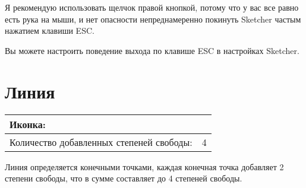 \documentclass[12pt,titlepage]{article}
\newcommand{\icon}[1]{\raisebox{-1em}{\rule{0pt}{27pt}\texttt{[image: images/\#1]}}}
\newcommand{\dofAdded}{Количество добавленных степеней свободы:}
\begin{document}
Я рекомендую использовать щелчок правой кнопкой, потому что у вас все равно есть рука на мыши, и нет опасности непреднамеренно покинуть Sketcher частым нажатием клавиши ESC.

Вы можете настроить поведение выхода по клавише ESC в настройках Sketcher.

\section{Линия}
\begin{tabular}{|l|l|}
\hline
Иконка: & \icon{Sketcher_CreateLine}\\
\hline
\dofAdded & 4\\
\hline
\end{tabular}

Линия определяется конечными точками, каждая конечная точка добавляет 2 степени свободы, что в сумме составляет до 4 степеней свободы.
\end{document}
